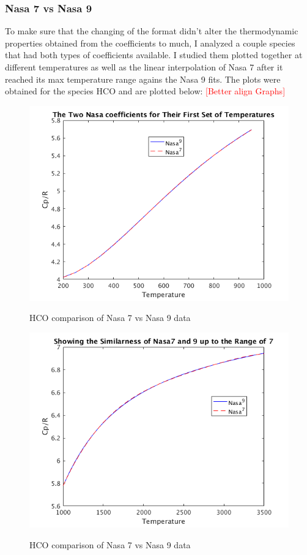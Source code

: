 \documentclass{article}
\newcommand{\red}[1]{\textcolor{red}{[#1]}} %
\begin{document}
\subsubsection{Nasa 7 vs Nasa 9}
To make sure that the changing of the format didn't alter the thermodynamic properties obtained from the coefficients to much, I analyzed a couple species that had both types of coefficients available. I studied them plotted together at different temperatures as well as the linear interpolation of Nasa 7 after it reached its max temperature range agains the Nasa 9 fits. The plots were obtained for the species HCO and are plotted below:
\red{Better align Graphs}


\begin{figure}[!bp]
  \centering
  \includegraphics[width=.8\linewidth]{./NasaPlots/Cp1.png}
  \label{fig:cp1}
  \caption{HCO comparison of Nasa 7 vs Nasa 9 data}
\end{figure}



\begin{figure}[!p]
  \centering
  \includegraphics[width=.8\linewidth]{./NasaPlots/Cp2.png}
  \label{fig:cp2}
  \caption{HCO comparison of Nasa 7 vs Nasa 9 data}
\end{figure}
\end{document}
